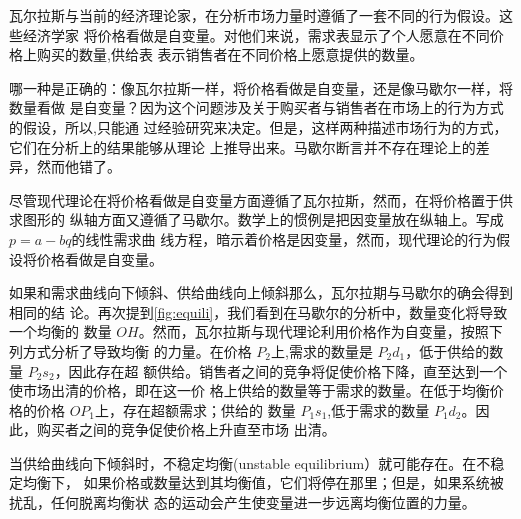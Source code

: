 瓦尔拉斯与当前的经济理论家，在分析市场力量时遵循了一套不同的行为假设。这些经济学家
将价格看做是自变量。对他们来说，需求表显示了个人愿意在不同价格上购买的数量,供给表
表示销售者在不同价格上愿意提供的数量。

哪一种是正确的：像瓦尔拉斯一样，将价格看做是自变量，还是像马歇尔一样，将数量看做
是自变量？因为这个问题涉及关于购买者与销售者在市场上的行为方式的假设，所以,只能通
过经验研究来决定。但是，这样两种描述市场行为的方式，它们在分析上的结果能够从理论
上推导出来。马歇尔断言并不存在理论上的差异，然而他错了。

尽管现代理论在将价格看做是自变量方面遵循了瓦尔拉斯，然而，在将价格置于供求图形的
纵轴方面又遵循了马歇尔。数学上的惯例是把因变量放在纵轴上。写成 $p=a-bq$的线性需求曲
线方程，暗示着价格是因变量，然而，现代理论的行为假设将价格看做是自变量。

如果和需求曲线向下倾斜、供给曲线向上倾斜那么，瓦尔拉期与马歇尔的确会得到相同的结
论。再次提到\cref{fig:equili}，我们看到在马歇尔的分析中，数量变化将导致一个均衡的
数量 $OH$。然而，瓦尔拉斯与现代理论利用价格作为自变量，按照下列方式分析了导致均衡
的力量。在价格 $P_2$上,需求的数量是 $P_2d_1$，低于供给的数量 $P_2s_2$，因此存在超
额供给。销售者之间的竞争将促使价格下降，直至达到一个使市场出清的价格，即在这一价
格上供给的数量等于需求的数量。在低于均衡价格的价格 $OP_1$上，存在超额需求；供给的
数量 $P_1s_1$,低于需求的数量 $P_1d_2$。因此，购买者之间的竞争促使价格上升直至市场
出清。

当供给曲线向下倾斜时，不稳定均衡(unstable equilibrium）就可能存在。在不稳定均衡下，
如果价格或数量达到其均衡值，它们将停在那里；但是，如果系统被扰乱，任何脱离均衡状
态的运动会产生使变量进一步远离均衡位置的力量。

